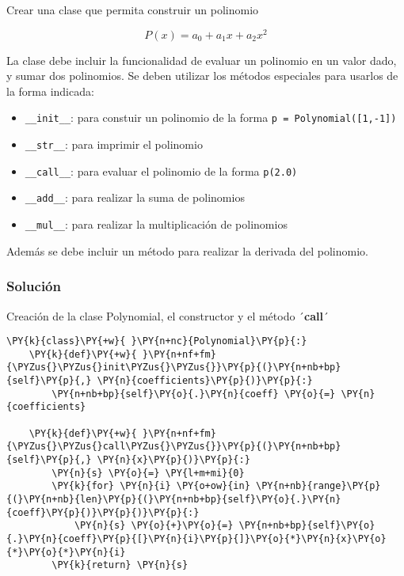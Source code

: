 \begin{example}
Crear una clase que permita construir un polinomio

\[ P(x) = a_0 + a_1x + a_2x^2 \]

La clase debe incluir la funcionalidad de evaluar un polinomio en un
valor dado, y sumar dos polinomios. Se deben utilizar los métodos
especiales para usarlos de la forma indicada:

\begin{itemize}
\item
  \texttt{\_\_init\_\_}: para constuir un polinomio de la forma
  \texttt{p\ =\ Polynomial({[}1,-1{]})}
\item
  \texttt{\_\_str\_\_}: para imprimir el polinomio
\item
  \texttt{\_\_call\_\_}: para evaluar el polinomio de la forma
  \texttt{p(2.0)}
\item
  \texttt{\_\_add\_\_}: para realizar la suma de polinomios
\item
  \texttt{\_\_mul\_\_}: para realizar la multiplicación de polinomios
\end{itemize}

Además se debe incluir un método para realizar la derivada del
polinomio.

\subsubsection{Solución}

Creación de la clase Polynomial, el constructor y el método ´\textbf{call}´

\begin{tcolorbox}[breakable, size=fbox, boxrule=1pt, pad at break*=1mm,colback=cellbackground, colframe=cellborder]
\begin{Verbatim}[commandchars=\\\{\}]
\PY{k}{class}\PY{+w}{ }\PY{n+nc}{Polynomial}\PY{p}{:}
    \PY{k}{def}\PY{+w}{ }\PY{n+nf+fm}{\PYZus{}\PYZus{}init\PYZus{}\PYZus{}}\PY{p}{(}\PY{n+nb+bp}{self}\PY{p}{,} \PY{n}{coefficients}\PY{p}{)}\PY{p}{:}
        \PY{n+nb+bp}{self}\PY{o}{.}\PY{n}{coeff} \PY{o}{=} \PY{n}{coefficients}

    \PY{k}{def}\PY{+w}{ }\PY{n+nf+fm}{\PYZus{}\PYZus{}call\PYZus{}\PYZus{}}\PY{p}{(}\PY{n+nb+bp}{self}\PY{p}{,} \PY{n}{x}\PY{p}{)}\PY{p}{:}
        \PY{n}{s} \PY{o}{=} \PY{l+m+mi}{0}
        \PY{k}{for} \PY{n}{i} \PY{o+ow}{in} \PY{n+nb}{range}\PY{p}{(}\PY{n+nb}{len}\PY{p}{(}\PY{n+nb+bp}{self}\PY{o}{.}\PY{n}{coeff}\PY{p}{)}\PY{p}{)}\PY{p}{:}
            \PY{n}{s} \PY{o}{+}\PY{o}{=} \PY{n+nb+bp}{self}\PY{o}{.}\PY{n}{coeff}\PY{p}{[}\PY{n}{i}\PY{p}{]}\PY{o}{*}\PY{n}{x}\PY{o}{*}\PY{o}{*}\PY{n}{i}
        \PY{k}{return} \PY{n}{s}
\end{Verbatim}
\end{tcolorbox}


\end{example}
